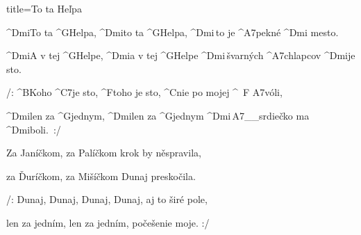 \begin{song}{title=\predtitle\centering To ta He\v lpa \\\large  \vspace*{-0.3cm}}  %
\begin{centerjustified}
\nejnejvetsi

\sloka 
	^{Dmi}To ta ^{G\z}Helpa, ^{Dmi}to ta ^{G\z}Helpa, ^{Dmi\,}to je ^{A7\z}pekné ^{Dmi\,\,}mesto.

	^{Dmi}A v tej ^{G\z}Helpe, ^{Dmi}a v tej ^{G\z}Helpe ^{Dmi\,\z}švarných ^{A7\z}chlapcov ^{Dmi}je sto.

	/: ^{B\z}Koho ^{C7}je sto, ^{F\z}toho je sto, ^{C}nie po mojej ^{\,\,\,F\,\,A7}vóli,

	^{Dmi}len za ^{G\z}jednym, ^{Dmi}len za ^{G\z}jednym ^{Dmi\,A7{\color{white}\_\_}}srdiečko ma ^{Dmi\z}boli.~:/


\sloka
	Za Janíčkom, za Palíčkom krok by něspravila,
	
	za Ďuríčkom, za Mišíčkom Dunaj preskočila.

	/: Dunaj, Dunaj, Dunaj, Dunaj, aj to širé pole,
	
	len za jedním, len za jedním, počešenie moje. :/

\end{centerjustified}
\setcounter{Slokočet}{0}
\end{song}
